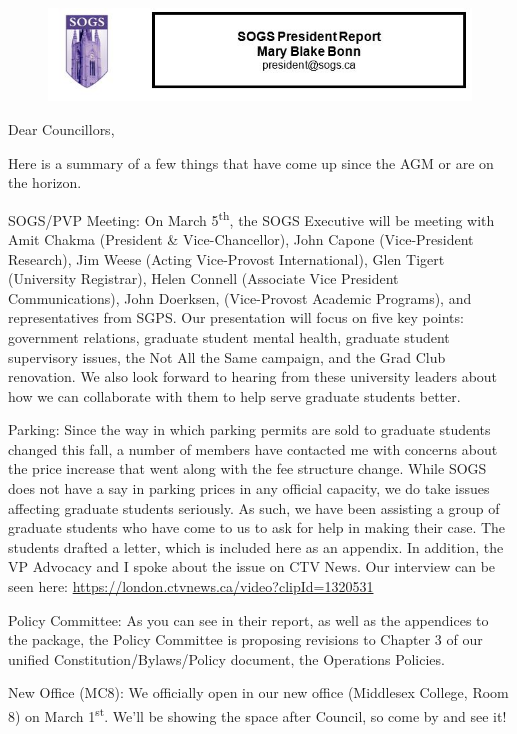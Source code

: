 
\begin{figure}%
    \centering
    \href{mailto:president@sogs.ca}{\includegraphics[scale=1]{President.JPG}}
\end{figure}

Dear Councillors,

Here is a summary of a few things that have come up since the AGM or are
on the horizon.

SOGS/PVP Meeting: On March 5\textsuperscript{th}, the SOGS Executive
will be meeting with Amit Chakma (President \& Vice-Chancellor), John
Capone (Vice-President Research), Jim Weese (Acting Vice-Provost
International), Glen Tigert (University Registrar), Helen Connell
(Associate Vice President Communications), John Doerksen, (Vice-Provost
Academic Programs), and \linebreak representatives from SGPS. Our presentation will
focus on five key points: government relations, graduate student mental
health, graduate student supervisory issues, the Not All the Same
campaign, and the Grad Club renovation. We also look forward to hearing
from these university leaders about how we can collaborate with them to
help serve graduate students better.

Parking: Since the way in which parking permits are sold to graduate
students changed this fall, a number of members have contacted me with
concerns about the price increase that went along with the fee structure
change. While SOGS does not have a say in parking prices in any official
capacity, we do take issues affecting graduate students seriously. As
such, we have been assisting a group of graduate students who have come
to us to ask for help in making their case. The students drafted a
letter, which is included here as an appendix. In addition, the VP
Advocacy and I spoke about the issue on CTV News. Our interview can be
seen here: \url{https://london.ctvnews.ca/video?clipId=1320531}

Policy Committee: As you can see in their report, as well as the
appendices to the package, the Policy Committee is proposing revisions
to Chapter 3 of our unified Constitution/Bylaws/Policy document, the
Operations Policies.

New Office (MC8): We officially open in our new office (Middlesex
College, Room 8) on March 1\textsuperscript{st}. We'll be showing the
space after Council, so come by and see it!

